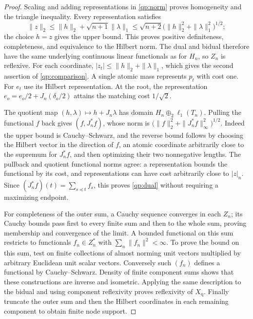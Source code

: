 \begin{proof}
Scaling and adding representations in \eqref{qp:norm} proves
homogeneity and the triangle inequality.  Every representation satisfies
\[
 \|z\|_2\le\|h\|_2+\sqrt{n+1}\|\lambda\|_1
 \le\sqrt{n+2}\bigl(\|h\|_2^2+\|\lambda\|_1^2\bigr)^{1/2};
\]
the choice $h=z$ gives the upper bound.  This proves positive
definiteness, completeness, and equivalence to the Hilbert norm.
The dual and bidual therefore have the same underlying continuous
linear functionals as for $H_n$, so $Z_n$ is reflexive.  For each
coordinate,
$|z_t|\le\|h\|_2+\|\lambda\|_1$, which gives the second assertion of
\eqref{qp:comparison}.  A single atomic mass represents $p_t$ with cost
one.  For $e_t$ use its Hilbert representation.  At the root, the
representation $e_o=e_o/2+J_n(\delta_o/2)$ attains the matching cost
$1/\sqrt2$.

The quotient map $(h,\lambda)\mapsto h+J_n\lambda$ has domain
$H_n\oplus_2\ell_1(T_n)$.  Pulling the functional $f$ back gives
$(f,J_n^*f)$, whose norm is
$\bigl(\|f\|_2^2+\|J_n^*f\|_\infty^2\bigr)^{1/2}$.
Indeed the upper bound is Cauchy--Schwarz, and the reverse bound follows
by choosing the Hilbert vector in the direction of $f$, an atomic
coordinate arbitrarily close to the supremum for $J_n^*f$, and then
optimizing their two nonnegative lengths.  The pullback and quotient
functional norms agree: a representation bounds the functional by its
cost, and representations can have cost arbitrarily close to
$|z|_n$.  Since $(J_n^*f)(t)=\sum_{s\preceq t}f_s$, this proves
\eqref{qp:dual} without requiring a maximizing endpoint.

For completeness of the outer sum, a Cauchy sequence converges in each
$Z_n$; its Cauchy bounds pass first to every finite sum and then to the
whole sum, proving membership and convergence of the limit.  A bounded
functional on this sum restricts to functionals $f_n\in Z_n^*$ with
$\sum_n\|f_n\|^2<\infty$.  To prove the bound on this sum, test on
finite collections of almost norming unit vectors multiplied by
arbitrary Euclidean unit scalar vectors.  Conversely such $(f_n)$
defines a functional by Cauchy--Schwarz.  Density of finite component
sums shows that these constructions are inverse and isometric.
Applying the same description to the bidual and using component
reflexivity proves reflexivity of $X_{\mathrm q}$.  Finally truncate
the outer sum and then the Hilbert coordinates in each remaining
component to obtain finite node support.
\end{proof}

